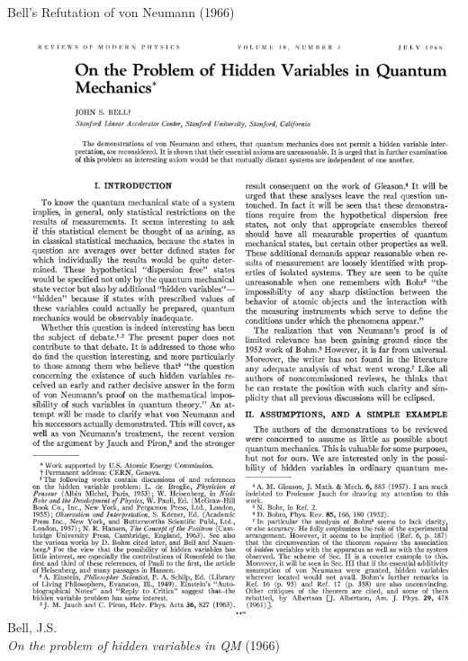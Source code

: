 \begin{frame}{Bell’s Refutation of von Neumann (1966)}
\begin{minipage}{0.33\textwidth}
  \includegraphics[width=\textwidth]{images/bell1966.png} \\
  \vspace{0.2cm}
  {\footnotesize Bell, J.S. \\
  \emph{On the problem of hidden variables in QM} (1966)}
\end{minipage}

\end{frame}




